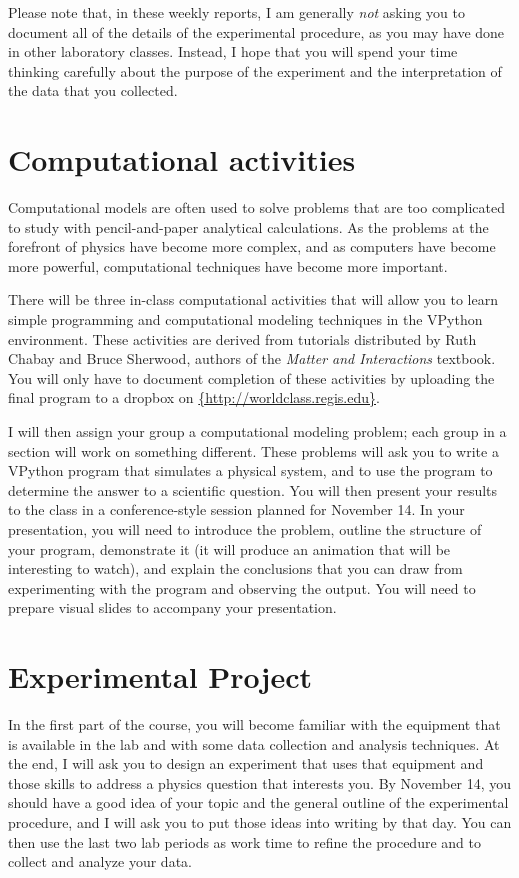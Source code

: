 \documentclass[11pt]{article}
\begin{document}
Please note that, in these weekly reports, I am generally {\em not} asking you 
to document all of the details of the experimental procedure, as you may
have done in other laboratory classes.  Instead, I hope that you will spend 
your time thinking carefully about the purpose of the experiment and the 
interpretation of the data that you collected.

\section{Computational activities}

Computational models are often used to solve problems that are too
complicated to study with pencil-and-paper analytical calculations.
As the problems at the forefront of physics have become more complex,
and as computers have become more powerful, computational techniques have
become more important.

There will be three in-class computational activities that will allow you
to learn simple programming and computational modeling techniques in the 
VPython environment.  These activities are derived from tutorials distributed
by Ruth Chabay and Bruce Sherwood, authors of the {\em{Matter and Interactions}}
textbook.  You will only have to document completion of these activities
by uploading the final program to a dropbox on \url{{http://worldclass.regis.edu}}.

I will then assign your group a computational modeling problem; each 
group in a section will work on something different.  These problems 
will ask you to write a VPython program that simulates a physical system,
and to use the program to determine the answer to a scientific question.
You will then present your results to the class in a conference-style
session planned for November 14.
In your presentation, you will need to introduce the problem, outline the
structure of your program, demonstrate it (it will produce
an animation that will be interesting to watch), and explain the conclusions
that you can draw from experimenting with the program and observing the output.
You will need to prepare visual slides to accompany your presentation.

\section{Experimental Project}

In the first part of the course, you will become familiar with the equipment
that is available in the lab and with some data collection and analysis
techniques.  At the end, I will ask you to design an experiment that uses
that equipment and those skills to address a physics question that 
interests you.  By November 14, you should have a good idea of your topic
and the general outline of the experimental procedure, and I will ask you to 
put those ideas into writing by that day.  You can then use the last two lab 
periods as work time to refine the procedure and to collect and analyze
your data.  
\end{document}
